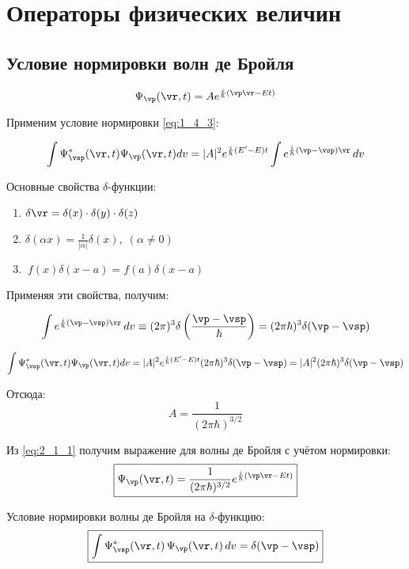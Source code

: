 \chapter{Операторы физических величин}

\section{Условие нормировки волн де Бройля}

\begin{equation}
\label{eq:2_1_1}
\Psi_{\vp}(\vr,t) = A e^{\frac{i}{\hbar}(\vp\vr-Et)}
\end{equation}

Применим условие нормировки \eqref{eq:1_4_3}:

$$\int \Psi^*_{\vsp}(\vr,t) \Psi_{\vp}(\vr,t) dv = |A|^2 e^{\frac{i}{\hbar}(E' - E)t} \int e^{\frac{i}{\hbar}(\vp - \vsp)\vr} \, dv$$

Основные свойства $\delta$-функции:
\begin{enumerate}
\item $ \delta {\vr} = \delta (x) \cdot \delta (y) \cdot \delta (z) $
\item $ \delta (\alpha x) = \frac{1}{|\alpha|} \delta (x), \; (\alpha \ne 0) $
\item $~ f(x) \delta (x - a) = f(a) \delta(x-a)$
\end{enumerate}

Применяя эти свойства, получим:

$$\int e^{\frac{i}{\hbar}(\vp - \vsp)\vr} \, dv \equiv (2 \pi )^3 \delta \left( \frac{\vp - \vsp}{\hbar} \right) = (2 \pi \hbar)^3 \delta (\vp - \vsp)$$

$$\int \Psi^*_{\vsp}(\vr,t) \Psi_{\vp}(\vr,t) dv = |A|^2 e^{\frac{i}{\hbar}(E' - E)t} (2 \pi \hbar)^3 \delta (\vp - \vsp) = |A|^2 (2 \pi \hbar)^3 \delta (\vp - \vsp)$$

Отсюда: $$A = \frac{1}{(2 \pi \hbar)^{3/2}}$$

Из \eqref{eq:2_1_1} получим выражение для волны де Бройля с учётом нормировки:
\begin{equation}
\label{eq:2_1_2}
\boxed{\Psi_{\vp}(\vr,t) = \frac{1}{(2 \pi \hbar)^{3/2}} e^{\frac{i}{\hbar} (\vp \vr - Et)}}
\end{equation}

Условие нормировки волны де Бройля на $\delta$-функцию:
\begin{equation}
\label{eq:2_1_3}
\boxed{\int\Psi^*_{\vsp}(\vr,t) \, \Psi_{\vp}(\vr,t) \, dv = \delta (\vp - \vsp)}
\end{equation}

